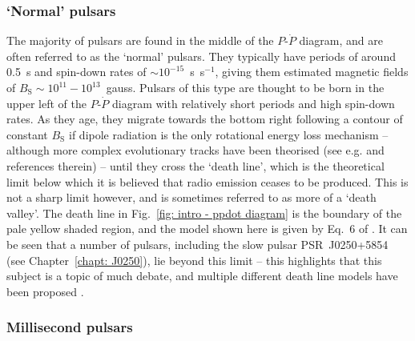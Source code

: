 \subsubsection{`Normal' pulsars}
\label{sec: intro - general intro - pulsar population - normal}

The majority of pulsars are found in the middle of the $P$-$\dot{P}$ diagram, and are often referred to as the `normal' pulsars. They typically have periods of around 0.5~s and spin-down rates of ${\sim}10^{-15}$~s~s$^{-1}$, giving them estimated magnetic fields of $B_\mathrm{S} \sim 10^{11}-10^{13}$~gauss. Pulsars of this type are thought to be born in the upper left of the $P$-$\dot{P}$ diagram with relatively short periods and high spin-down rates. As they age, they migrate towards the bottom right following a contour of constant $B_\mathrm{S}$ if dipole radiation is the only rotational energy loss mechanism -- although more complex evolutionary tracks have been theorised (see e.g. \citealt{JKxx2017} and references therein) -- until they cross the `death line', which is the theoretical limit below which it is believed that radio emission ceases to be produced. This is not a sharp limit however, and is sometimes referred to as more of a `death valley'. The death line in Fig.~\ref{fig: intro - ppdot diagram} is the boundary of the pale yellow shaded region, and the model shown here is given by Eq.~6 of \citet{ZHMx2000}. It can be seen that a number of pulsars, including the slow pulsar PSR~J0250+5854 (see Chapter~\ref{chapt: J0250}), lie beyond this limit -- this highlights that this subject is a topic of much debate, and multiple different death line models have been proposed \citep[e.g.][]{CRxx1993,ZHMx2000, FKxx2006, JKxx2017, MBMA2020}.


\subsubsection{Millisecond pulsars}
\label{sec: intro - general intro - pulsar population - MSPs}

